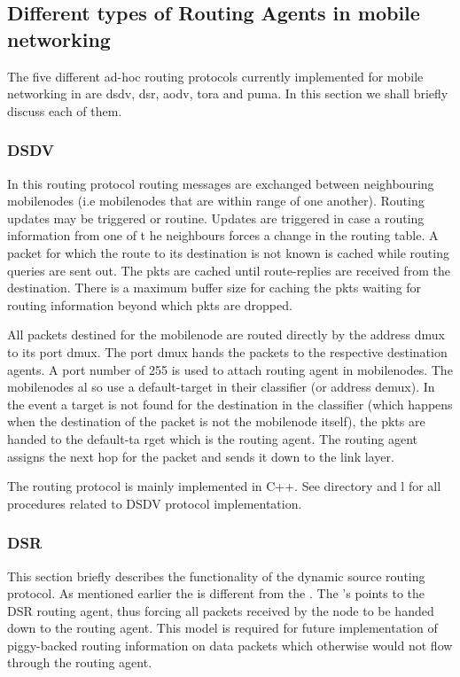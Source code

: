 \subsection{Different types of Routing Agents in mobile networking}
\label{sec:mobilenode-routing}

The five different ad-hoc routing protocols currently implemented
for mobile networking in \ns are dsdv, dsr, aodv, tora and puma. 
In this section we shall briefly discuss each of them.

\subsubsection{DSDV}
\label{sec:dsdv}

In this routing protocol routing messages are exchanged between
neighbouring mobilenodes (i.e mobilenodes that are within range of one
another). Routing updates may be triggered or routine. Updates are
triggered in case a routing information from one of t   
he neighbours forces a change in the routing table.
A packet for which the route to its destination is not known is cached
while routing queries are sent out. The pkts are cached until
route-replies are received from the destination. There is a maximum buffer
size for caching the pkts waiting for routing information beyond which
pkts are dropped. 

All packets destined for the mobilenode are routed directly by the address
dmux to its port dmux. The port dmux hands the packets to the respective
destination agents. A port number of 255 is used to attach routing agent
in mobilenodes. The mobilenodes al
so use a default-target in their classifier (or address demux). In the
event a target is not found for the destination in the classifier (which
happens when the destination of the packet is not the mobilenode itself),
the pkts are handed to the default-ta   
rget which is the routing agent. The routing agent assigns the next hop
for the packet and sends it down to the link layer. 

The routing protocol is mainly implemented in C++. See 
directory and l for all procedures related to
DSDV protocol implementation.  

\subsubsection{DSR}
\label{sec:dsr}

This section briefly describes the functionality of the dynamic source
routing protocol. As mentioned earlier the  is different from
the .  The 's  points to the
DSR routing agent, thus forcing all    
packets received by the node to be handed down to the routing agent. This
model is required for future implementation of piggy-backed routing
information on data packets which otherwise would not flow through the
routing agent.   

